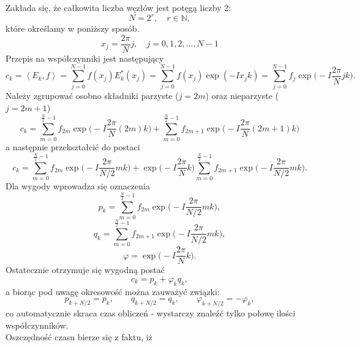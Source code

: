 Zakłada się, że całkowita liczba węzłów jest potęgą liczby 2:
\begin{equation}
N = 2^r, \quad r \in \mathbb{N},
\end{equation}
które określamy w poniższy sposób.
\begin{equation}
x_j = \frac{2\pi}{N}j, \quad j = 0, 1, 2, \dots, N -1
\end{equation}
Przepis na współczynniki jest następujący
\begin{equation}
c_k = \left< E_k, f \right> = \sum_{j=0}^{N-1}f(x_j) E_k^{*} (x_j) = \sum_{j=0}^{N-1} f(x_j) \exp(-Ix_jk) = \sum_{j=0}^{N-1} f_j \exp \bigg( -I \frac{2\pi}{N}jk \bigg).
\end{equation}
Należy zgrupować osobno składniki parzyste ($j = 2m $) oraz nieparzyste ($j=2m+1$)
\begin{equation}
c_k = \sum_{m=0}^{\frac{N}{2} -1} f_{2m} \exp \bigg( -I \frac{2\pi}{N}(2m)k \bigg)  +
\sum_{m=0}^{\frac{N}{2} -1} f_{2m+1} \exp \bigg( -I \frac{2\pi}{N}(2m+1)k \bigg) 
\end{equation}
a następnie przekształcić do postaci
\begin{equation}
c_k = \sum_{m=0}^{\frac{N}{2} -1} f_{2m} \exp \bigg( -I \frac{2\pi}{N/2}mk \bigg)  +
\exp \bigg( -I\frac{2\pi}{N} k\bigg) \sum_{m=0}^{\frac{N}{2} -1} f_{2m+1} \exp \bigg( -I \frac{2\pi}{N/2}mk \bigg).
\end{equation}
Dla wygody wprowadza się oznaczenia
\begin{equation}
p_k = \sum_{m=0}^{\frac{N}{2} -1} f_{2m} \exp \bigg( -I \frac{2\pi}{N/2}mk \bigg),
\end{equation}
\begin{equation}
q_k =\sum_{m=0}^{\frac{N}{2} -1} f_{2m+1} \exp \bigg( -I \frac{2\pi}{N/2}mk \bigg) ,
\end{equation}
\begin{equation}
\varphi = \exp \bigg( -I\frac{2\pi}{N} k\bigg).
\end{equation}
Ostatecznie otrzymuje się wygodną postać
\begin{equation}
c_k = p_k + \varphi_k q_k,
\end{equation}
a biorąc pod uwagę okresowość można zauważyć związki:
\begin{equation}
p_{k+N/2} = p_k, \quad \quad q_{k+N/2} = q_k, \quad \quad \varphi_{k+N/2} = - \varphi_k,
\end{equation}
co automatycznie skraca czas obliczeń - wystarczy znaleźć tylko połowę ilości współczynników.
\\Oszczędność czasu bierze się z faktu, iż
